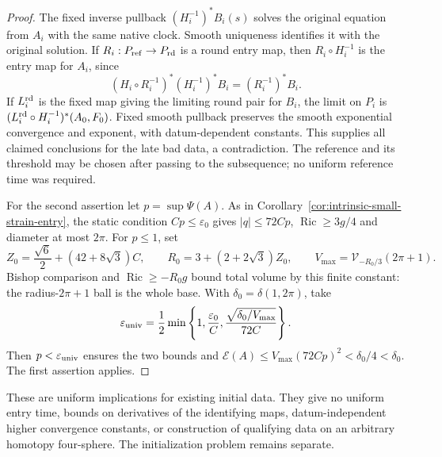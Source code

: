 \documentclass[11pt]{article}
\numberwithin{equation}{section}
\theoremstyle{definition}
\theoremstyle{remark}
\DeclareMathOperator{\Ric}{Ric}
\begin{document}
\begin{proof}
The fixed inverse pullback $(H_i^{-1})^*B_i(s)$ solves the
original equation from $A_i$ with the same native clock.
Smooth uniqueness identifies it with the original solution.
If $R_i:P_{\rm ref}\to P_{\rm rd}$ is a round entry map,
then $R_i\circ H_i^{-1}$ is the entry map for $A_i$, since
\[
 (H_i\circ R_i^{-1})^*(H_i^{-1})^*B_i
                  =(R_i^{-1})^*B_i.
\]
If $L_i^{\rm rd}$ is the fixed map giving the limiting round
pair for $B_i$, the limit on $P_i$ is
$(L_i^{\rm rd}\circ H_i^{-1})^*(A_0,F_0)$. Fixed smooth
pullback preserves the smooth exponential convergence and
exponent, with datum-dependent constants. This supplies all
claimed conclusions for the late bad data, a contradiction.
The reference and its threshold may be chosen after passing
to the subsequence; no uniform reference time was required.

For the second assertion let $p=\sup\Psi(A)$. As in
Corollary~\ref{cor:intrinsic-small-strain-entry}, the static
condition $Cp\le\varepsilon_0$ gives
$|q|\le72Cp$, $\Ric\ge3g/4$ and diameter at most $2\pi$.
For $p\le1$, set
\[
 Z_0=\frac{\sqrt6}{2}+(42+8\sqrt3)C,\qquad
 R_0=3+(2+2\sqrt3)Z_0,\qquad
 V_{\max}=\mathcal V_{-R_0/3}(2\pi+1).
\]
Bishop comparison and $\Ric\ge-R_0g$ bound total volume
by this finite constant: the radius-$2\pi+1$ ball is the
whole base. With $\delta_0=\delta(1,2\pi)$, take
\[
 \varepsilon_{\rm univ}=\frac12\min\left\{
  1,\frac{\varepsilon_0}{C},
  \frac{\sqrt{\delta_0/V_{\max}}}{72C}\right\}.
\]
Then $p<\varepsilon_{\rm univ}$ ensures the two bounds and
$\mathscr E(A)\le V_{\max}(72Cp)^2<\delta_0/4<\delta_0$.
The first assertion applies.
\end{proof}

These are uniform implications for existing initial data.
They give no uniform entry time, bounds on derivatives of the
identifying maps, datum-independent higher convergence constants,
or construction of qualifying data on an arbitrary homotopy
four-sphere. The initialization problem remains separate.
\end{document}
